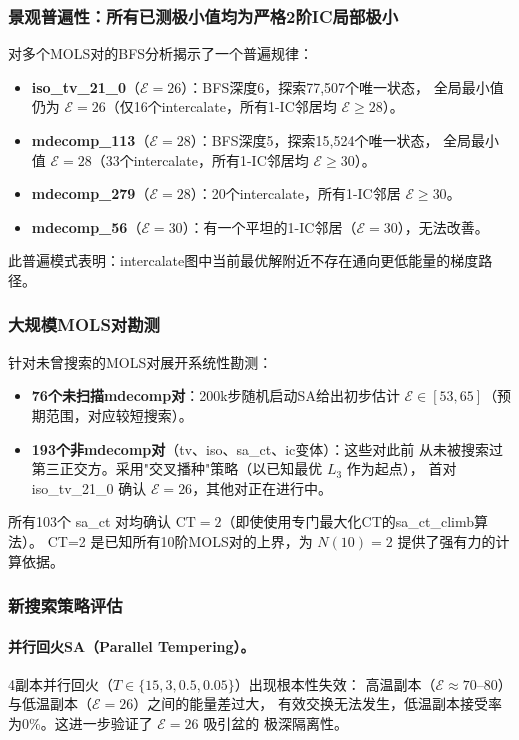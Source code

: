 \documentclass[11pt,a4paper]{ctexart}
\theoremstyle{remark}
\newcommand{\CT}{\mathrm{CT}}
\newcommand{\E}{\mathcal{E}}
\begin{document}
\subsubsection{景观普遍性：所有已测极小值均为严格2阶IC局部极小}

对多个MOLS对的BFS分析揭示了一个普遍规律：

\begin{itemize}[noitemsep]
  \item \textbf{iso\_tv\_21\_0}（$\E=26$）：BFS深度6，探索77,507个唯一状态，
    全局最小值仍为 $\E=26$（仅16个intercalate，所有1-IC邻居均 $\E \geq 28$）。
  \item \textbf{mdecomp\_113}（$\E=28$）：BFS深度5，探索15,524个唯一状态，
    全局最小值 $\E=28$（33个intercalate，所有1-IC邻居均 $\E \geq 30$）。
  \item \textbf{mdecomp\_279}（$\E=28$）：20个intercalate，所有1-IC邻居 $\E \geq 30$。
  \item \textbf{mdecomp\_56}（$\E=30$）：有一个平坦的1-IC邻居（$\E=30$），无法改善。
\end{itemize}

此普遍模式表明：intercalate图中当前最优解附近不存在通向更低能量的梯度路径。

\subsubsection{大规模MOLS对勘测}

针对未曾搜索的MOLS对展开系统性勘测：
\begin{itemize}[noitemsep]
  \item \textbf{76个未扫描mdecomp对}：200k步随机启动SA给出初步估计
    $\E \in [53, 65]$（预期范围，对应较短搜索）。
  \item \textbf{193个非mdecomp对}（tv、iso、sa\_ct、ic变体）：这些对此前
    从未被搜索过第三正交方。采用"交叉播种"策略（以已知最优 $L_3$ 作为起点），
    首对 iso\_tv\_21\_0 确认 $\E=26$，其他对正在进行中。
\end{itemize}

所有103个 sa\_ct 对均确认 $\CT = 2$（即使使用专门最大化CT的sa\_ct\_climb算法）。
CT=2 是已知所有10阶MOLS对的上界，为 $N(10)=2$ 提供了强有力的计算依据。

\subsubsection{新搜索策略评估}

\paragraph{并行回火SA（Parallel Tempering）。}
4副本并行回火（$T \in \{15, 3, 0.5, 0.05\}$）出现根本性失效：
高温副本（$\E \approx 70$--$80$）与低温副本（$\E = 26$）之间的能量差过大，
有效交换无法发生，低温副本接受率为0\%。这进一步验证了 $\E=26$ 吸引盆的
极深隔离性。
\end{document}
